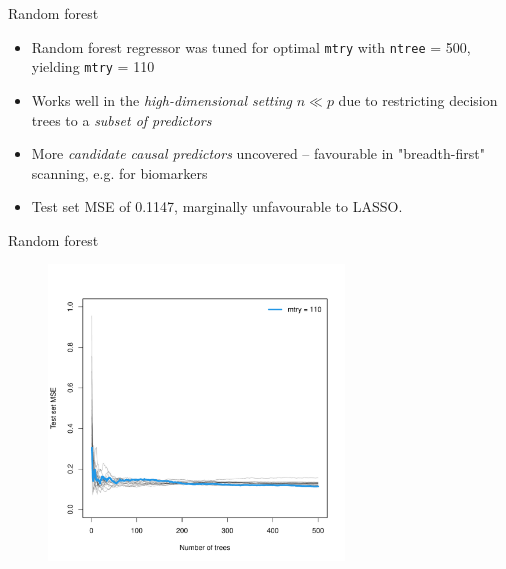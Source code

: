 \documentclass{beamer}
\let\OldTexttt\texttt
\renewcommand{\texttt}[1]{\OldTexttt{{\textcolor{islrred}{#1}}}}
\let\OldTextit\textit
\renewcommand{\textit}[1]{\OldTextit{{\textcolor{islrgreen}{#1}}}}
\begin{document}
\begin{frame}{Random forest}
  \begin{itemize}
    \item Random forest regressor was tuned for optimal \texttt{mtry} with
      \texttt{ntree} = 500, yielding \texttt{mtry} = 110
    \item Works well in the \textit{high-dimensional setting} \(n \ll p\) due to 
      restricting decision trees to a \textit{subset of predictors}
    \item More \textit{candidate causal predictors} uncovered -- favourable in
      "breadth-first" scanning, e.g. for biomarkers
    \item Test set MSE of 0.1147, marginally unfavourable to LASSO.
  \end{itemize}
\end{frame}

\begin{frame}{Random forest}
 \begin{figure}
  \begin{center}
    \includegraphics[width=0.7\textwidth]{rf_err.pdf}
  \end{center}
 \end{figure}
\end{frame}
\end{document}
